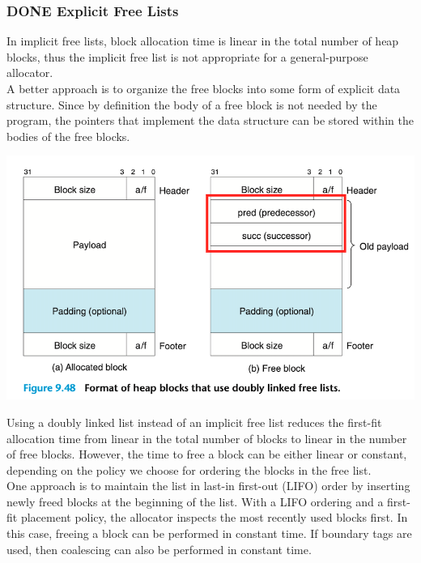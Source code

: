\documentclass[11pt]{article}
\begin{document}
\subsubsection{{\bfseries\sffamily DONE} Explicit Free Lists}
\label{sec:org175ff8e}
In implicit free lists, block allocation time is linear in the total number of heap blocks, thus the implicit free list is not appropriate for a general-purpose allocator.\\

A better approach is to organize the free blocks into some form of explicit data structure. Since by definition the body of a free block is not needed by the program, the pointers that implement the data structure can be stored within the bodies of the free blocks.\\


\begin{center}
\includegraphics[width=.9\linewidth]{pics/figure9.48-double-linked-free-list.png}
\end{center}

Using a doubly linked list instead of an implicit free list reduces the first-fit allocation time from linear in the total number of blocks to linear in the number of free blocks. However, the time to free a block can be either linear or constant, depending on the policy we choose for ordering the blocks in the free list.\\

One approach is to maintain the list in last-in first-out (LIFO) order by inserting newly freed blocks at the beginning of the list. With a LIFO ordering and a first-fit placement policy, the allocator inspects the most recently used blocks first. In this case, freeing a block can be performed in constant time. If boundary tags are used, then coalescing can also be performed in constant time.\\
\end{document}
